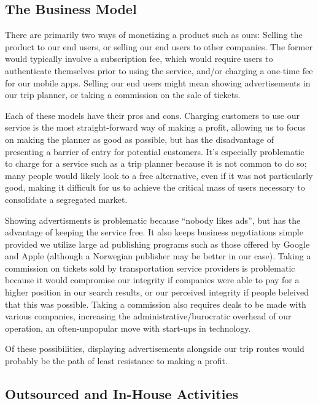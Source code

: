 \subsection{The Business Model}

There are primarily two ways of monetizing a product such as ours: Selling the
product to our end users, or selling our end users to other companies. The
former would typically involve a subscription fee, which would require users
to authenticate themselves prior to using the service, and/or charging a
one-time fee for our mobile apps. Selling our end users might mean showing
advertisements in our trip planner, or taking a commission on the sale of
tickets.

Each of these models have their pros and cons. Charging customers to use our
service is the most straight-forward way of making a profit, allowing us to
focus on making the planner as good as possible, but has the disadvantage
of presenting a barrier of entry for potential customers. It's especially
problematic to charge for a service such as a trip planner because it is
not common to do so; many people would likely look to a free alternative,
even if it was not particularly good, making it difficult for us to achieve
the critical mass of users necessary to consolidate a segregated market.

Showing advertisments is problematic because ``nobody likes ads'', but has the
advantage of keeping the service free. It also keeps business negotiations
simple provided we utilize large ad publishing programs such as those offered
by Google and Apple (although a Norwegian publisher may be better in our
case). Taking a commission on tickets sold by transportation service providers
is problematic because it would compromise our integrity if companies were
able to pay for a higher position in our search results, or our perceived
integrity if people beleived that this was possible. Taking a commission
also requires deals to be made with various companies, increasing the
administrative/burocratic overhead of our operation, an often-unpopular move
with start-ups in technology.

Of these possibilities, displaying advertisements alongside our trip routes
would probably be the path of least resistance to making a profit.

\subsection{Outsourced and In-House Activities}

